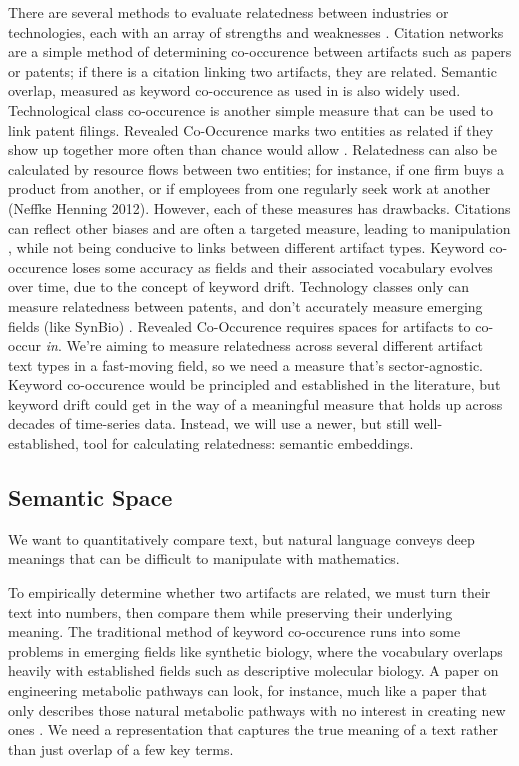 \documentclass[12pt,a4paper]{article}
\begin{document}
	There are several methods to evaluate relatedness between industries or technologies, each with an array of strengths and weaknesses \parencite{neffkeSkillRelatednessFirm2013a}. Citation networks are a simple method of determining co-occurence between artifacts such as papers or patents; if there is a citation linking two artifacts, they are related. Semantic overlap, measured as keyword co-occurence as used in \parencite{boschmaScientificKnowledgeDynamics2014} is also widely used. Technological class co-occurence is another simple measure that can be used to link patent filings. Revealed Co-Occurence marks two entities as related if they show up together more often than chance would allow \parencite{hidalgoProductSpaceConditions2007}. Relatedness can also be calculated by resource flows between two entities; for instance, if one firm buys a product from another, or if employees from one regularly seek work at another (Neffke Henning 2012). However, each of these measures has drawbacks. Citations can reflect other biases and are often a targeted measure, leading to manipulation \parencite{bacciniGlobalExploratoryComparison2023}, while not being conducive to links between different artifact types. Keyword co-occurence loses some accuracy as fields and their associated vocabulary evolves over time, due to the concept of keyword drift. Technology classes only can measure relatedness between patents, and don't accurately measure emerging fields (like SynBio) \parencite{jiangNaturalLanguageProcessing2025}. Revealed Co-Occurence requires spaces for artifacts to co-occur \textit{in}. We're aiming to measure relatedness across several different artifact text types in a fast-moving field, so we need a measure that's sector-agnostic. Keyword co-occurence would be principled and established in the literature, but keyword drift could get in the way of a meaningful measure that holds up across decades of time-series data. Instead, we will use a newer, but still well-established, tool for calculating relatedness: semantic embeddings.
	
	\subsection{Semantic Space}
	
	We want to quantitatively compare text, but natural language conveys deep meanings that can be difficult to manipulate with mathematics. 
	
	
	To empirically determine whether two artifacts are related, we must turn their text into numbers, then compare them while preserving their underlying meaning. The traditional method of keyword co-occurence runs into some problems in emerging fields like synthetic biology, where the vocabulary overlaps heavily with established fields such as descriptive molecular biology. A paper on engineering metabolic pathways can look, for instance, much like a paper that only describes those natural metabolic pathways with no interest in creating new ones \parencite{oldhamSyntheticBiologyMapping2018}. We need a representation that captures the true meaning of a text rather than just overlap of a few key terms.
	
\end{document}
